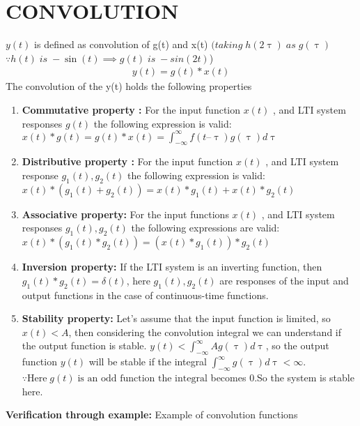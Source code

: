 \documentclass[journal,12pt,twocolumn]{IEEEtran}
\begin{document}
\section*{CONVOLUTION}
 $y(t)$ is defined as convolution of g(t) and x(t) $ (taking \; h(2\uptau)\; as\; g(\uptau)$ $\because h(t) \;is \; -\sin(t) \implies g(t) \;is\; -sin(2t)$)
\begin{align}
    y(t) = g(t) * x(t) 
\end{align}
The convolution of the y(t) holds the following properties 
\begin{enumerate}
    \item  \textbf{Commutative property :}  For the input function $x(t)$ , and LTI system responses $g(t)$  the following expression is valid:\\
    $x(t)*g(t)=g(t)*x(t)=\int_{-\infty}^{\infty}f(t–\uptau)g(\uptau)d\uptau$
    \item  \textbf{Distributive property :}
    For the input function $x(t)$ , and LTI system response $g_1(t), g_2(t)$  the following expression is valid:\\ $x(t)*(g_1(t)+g_2(t))=x(t)*g_1(t)+x(t)*g_2(t)$
    \item  \textbf{Associative property:}
    For the input functions $x(t)$ , and LTI system responses $g_1(t), g_2(t)$  the following expressions are valid:\\ $x(t)*(g_1(t)*g_2(t))=(x(t)*g_1(t))*g_2(t)$
    \item \textbf{Inversion property:}
    If the LTI system is an inverting function, then $g_1(t)*g_2(t)=\delta(t) $, here $g_1(t), g_2(t)$ are responses of the input and output functions in the case of continuous-time functions.
    \item \textbf{Stability property:}
    Let’s assume that the input function is limited, so $x(t)<A$, then considering the convolution integral we can understand if the output function is stable. $y(t)<\int_{-\infty}^{\infty} Ag(\uptau)d\uptau$, so the output function $y(t)$ will be stable if the integral $\int_{-\infty}^{\infty} g(\uptau)d\uptau < \infty$. $\because \text{Here} \; g(t) \; \text{is an odd function the integral}$ becomes 0.So the system is stable here.
\end{enumerate}
\newpage
\textbf{Verification through example:}
Example of convolution functions
\end{document}
